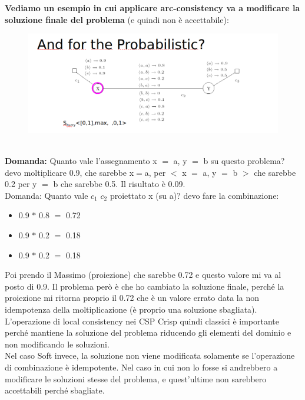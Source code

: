 \noindent \textbf{Vediamo un esempio in cui applicare arc-consistency va a
    modificare la soluzione finale del problema} (e quindi non è accettabile):
\begin{figure}[htp]
    \centering
    \includegraphics[width=14cm, keepaspectratio]{img/Cap5/probabilistc2.png}
\end{figure}
\\
\textbf{Domanda:} Quanto vale l'assegnamento x $=$ a, y $=$ b su questo
problema? \\devo moltiplicare 0.9, che sarebbe x$=$a, per $<$ x $=$ a, y $=$ b
$>$ che sarebbe 0.2 per y $=$ b che sarebbe 0.5. Il risultato è 0.09. \\Domanda:
Quanto vale $c_1$ $c_2$ proiettato x (su a)? devo fare la combinazione:
\begin{itemize}
    \item 0.9 $*$ 0.8 $=$ 0.72
    \item 0.9 $*$ 0.2 $=$ 0.18
    \item 0.9 $*$ 0.2 $=$ 0.18
\end{itemize}
Poi prendo il Massimo (proiezione) che sarebbe 0.72 e questo valore mi va al
posto di 0.9. Il problema però è che ho cambiato la soluzione finale, perché la
proiezione mi ritorna proprio il 0.72 che è un valore errato data la non
idempotenza della moltiplicazione (è proprio una soluzione sbagliata).\\

L'operazione di local consistency nei CSP Crisp quindi classici è
importante perché mantiene la soluzione del problema riducendo gli elementi del
dominio e non modificando le soluzioni.\\

Nel caso Soft invece, la soluzione non viene modificata solamente se
l'operazione di combinazione è idempotente. Nel caso in cui non lo fosse si
andrebbero a modificare le soluzioni stesse del problema, e quest'ultime non
sarebbero accettabili perché sbagliate.

